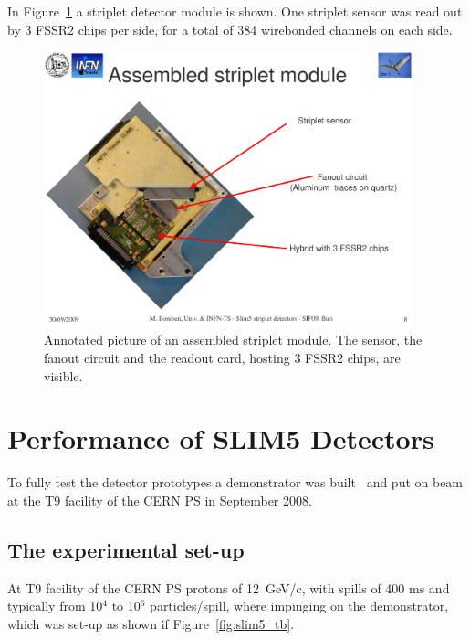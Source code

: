 In Figure~\ref{fig:assembled_striplets} a striplet detector module is shown.
One striplet sensor was read out by 3 FSSR2 chips per side, for a total of 384 wirebonded channels 
on each side. 
\begin{figure}[!htpb]
\centering
\includegraphics[width=0.95\textwidth]{assembeld_striplets.pdf}
\caption{\label{fig:assembled_striplets}Annotated picture of an assembled striplet module. The 
sensor, the fanout circuit and the readout card, hosting 3 FSSR2 chips, are visible.}
\end{figure}



\section{Performance of SLIM5 Detectors}
\label{sec:SLIM5Results}
To fully test the detector prototypes a demonstrator was built~\cite{BETTARINI2010942} and put  on 
beam at the T9 facility of the CERN PS in September 2008.

\subsection{The experimental set-up}

At T9 facility of the CERN PS protons of 12~GeV/c, with spills of 400 ms and typically from 10$^4$ to
 10$^6$ particles/spill, where impinging on the demonstrator, which was set-up as shown if 
 Figure~\ref{fig:slim5_tb}.


